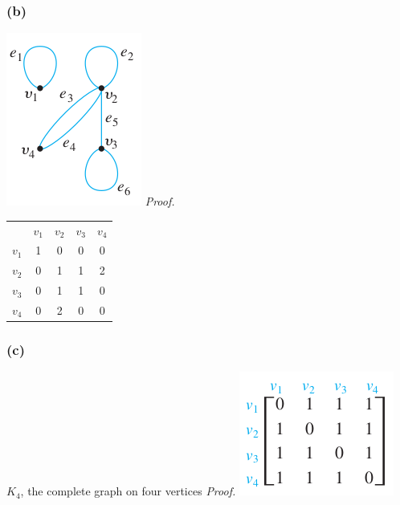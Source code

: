 \documentclass[14pt]{extarticle}
\newcommand{\cy}{\color{cyan}}
\begin{document}
\subsubsection{(b)}
\includegraphics[scale=0.6]{../images/10.2.4.b.1.png}
{\it Proof.}
\begin{tabular}{ccccc}
                  & {\cy \(v_1\)} & {\cy \(v_2\)} & {\cy \(v_3\)} & {\cy \(v_4\)} \\
    {\cy \(v_1\)} & 1             & 0             & 0             & 0             \\
    {\cy \(v_2\)} & 0             & 1             & 1             & 2             \\
    {\cy \(v_3\)} & 0             & 1             & 1             & 0             \\
    {\cy \(v_4\)} & 0             & 2             & 0             & 0             \\
\end{tabular}

\subsubsection{(c)}
\(K_4\), the complete graph on four vertices
    {\it Proof.} \includegraphics[scale=0.6]{../images/10.2.4.c.png}
\end{document}
